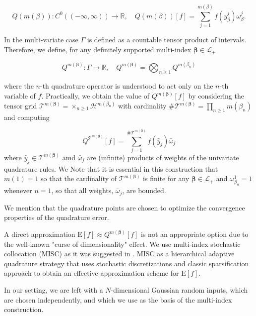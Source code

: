 \documentclass[11pt]{article}
\newcommand{\expt}[1]{\mathrm{E}\left[#1\right]}
\newcommand{\rset}{\mathbb{R}}
\begin{document}
\begin{equation}
Q(m(\beta)):C^0((-\infty,\infty)) \rightarrow \rset, \quad Q(m(\beta))[f]= \sum_{j=1}^{m(\beta)} f(y^j_\beta) \omega_\beta^j.
\end{equation}






In the multi-variate case $\Gamma$ is defined as a countable tensor
product of intervals. Therefore,  we define, for any definitely supported multi-index $\boldsymbol{\beta} \in \mathcal{L}_+$

$$Q^{m(\boldsymbol{\beta})}: \Gamma \rightarrow \rset,\quad  Q^{m(\boldsymbol{\beta})}= \bigotimes_{n \ge 1} Q^{m(\beta_n)} $$

where the $n$-th quadrature operator is understood to act only on the $n$-th variable of $f$. Practically, we obtain the value of $Q^{m(\boldsymbol{\beta})}[f]$  by considering the tensor grid $\mathcal{T}^{m(\boldsymbol{\beta})}= \times_{n \ge 1} \mathcal{H}^{m(\beta_n)}$ with cardinality $\#\mathcal{T}^{m(\boldsymbol{\beta})}=\prod_{n \ge 1} m (\beta_n)$ and computing

$$ Q^{\mathcal{T}^{m(\boldsymbol{\beta})}}[f]= \sum_{j=1}^{\#\mathcal{T}^{m(\boldsymbol{\beta})}} f(\hat{y}_j) \bar{\omega}_j$$
where $\hat{y}_j \in \mathcal{T}^{m(\boldsymbol{\beta})}$ amd $\bar{\omega}_j$ are (infinite) products of weights of the univariate quadrature rules. We Note that it is essential in this construction that $m(1)=1$ so that the cardinality of $\mathcal{T}^{m(\boldsymbol{\beta})}$ is finite for any $\boldsymbol{\beta} \in \mathcal{L}_+$ and $ \omega_{\beta_n}^1=1$ whenever $n = 1$, so that all weights, $\bar{\omega}_j$, are bounded.

We mention that the quadrature points are chosen to optimize the convergence properties of the quadrature error.  

A direct approximation $\expt{f} \approx Q^{m(\boldsymbol{\beta})}[f]$ is not an appropriate option  due to the well-known "curse of dimensionality" effect. We use multi-index stochastic collocation (MISC) as it was suggested  in \cite{haji2016multi}. MISC as a hierarchical adaptive quadrature strategy that uses  stochastic discretizations  and classic sparsification approach to obtain an effective approximation scheme for $\expt{f}$. 


In our setting, we are left with a $N$-dimensional Gaussian random inputs, which are chosen independently, and which we use as the basis of the multi-index construction. 
\end{document}
